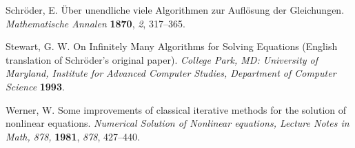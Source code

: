 \documentclass[10pt,a4paper]{article}
\begin{document}
\begin{thebibliography}{plain}
Schr\"oder, E. \"Uber unendliche viele Algorithmen zur Aufl\"osung der Gleichungen. {\em Mathematische Annalen} {\bf 1870}, {\em 2}, 317--365.

Stewart, G. W.  On Infinitely Many Algorithms for Solving Equations (English translation of Schr\"oder's original paper). {\em College Park, MD: University of Maryland, Institute for Advanced Computer Studies, Department of Computer Science} {\bf 1993}.

Werner, W.  Some improvements of classical iterative methods for the solution of nonlinear equations. {\em Numerical Solution of Nonlinear equations, Lecture Notes in Math, 878,} {\bf 1981}, {\em 878}, 427--440.
%
\end{thebibliography}
\end{document}

